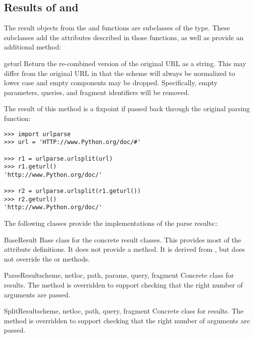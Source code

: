 \subsection{Results of  and 
            \label{urlparse-result-object}}

The result objects from the  and
 functions are subclasses of the 
type.  These subclasses add the attributes described in those
functions, as well as provide an additional method:

\begin{methoddesc}[ParseResult]{geturl}{}
  Return the re-combined version of the original URL as a string.
  This may differ from the original URL in that the scheme will always
  be normalized to lower case and empty components may be dropped.
  Specifically, empty parameters, queries, and fragment identifiers
  will be removed.

  The result of this method is a fixpoint if passed back through the
  original parsing function:

\begin{verbatim}
>>> import urlparse
>>> url = 'HTTP://www.Python.org/doc/#'

>>> r1 = urlparse.urlsplit(url)
>>> r1.geturl()
'http://www.Python.org/doc/'

>>> r2 = urlparse.urlsplit(r1.geturl())
>>> r2.geturl()
'http://www.Python.org/doc/'
\end{verbatim}

\end{methoddesc}

The following classes provide the implementations of the parse results::

\begin{classdesc*}{BaseResult}
  Base class for the concrete result classes.  This provides most of
  the attribute definitions.  It does not provide a 
  method.  It is derived from , but does not override the
   or  methods.
\end{classdesc*}


\begin{classdesc}{ParseResult}{scheme, netloc, path, params, query, fragment}
  Concrete class for  results.  The
   method is overridden to support checking that the
  right number of arguments are passed.
\end{classdesc}


\begin{classdesc}{SplitResult}{scheme, netloc, path, query, fragment}
  Concrete class for  results.  The
   method is overridden to support checking that the
  right number of arguments are passed.
\end{classdesc}
